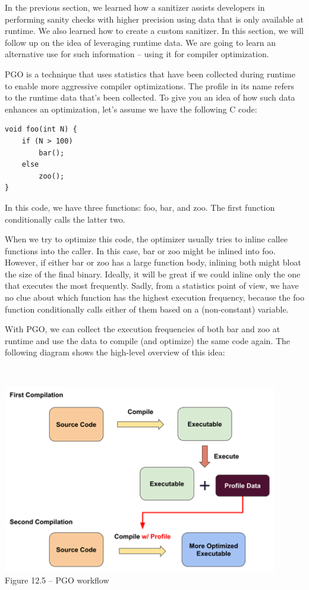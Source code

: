 
In the previous section, we learned how a sanitizer assists developers in performing sanity checks with higher precision using data that is only available at runtime. We also learned how to create a custom sanitizer. In this section, we will follow up on the idea of leveraging runtime data. We are going to learn an alternative use for such information – using it for compiler optimization.

PGO is a technique that uses statistics that have been collected during runtime to enable more aggressive compiler optimizations. The profile in its name refers to the runtime data that's been collected. To give you an idea of how such data enhances an optimization, let's assume we have the following C code:

\begin{lstlisting}[style=styleCXX]
void foo(int N) {
	if (N > 100)
		bar();
	else
		zoo();
}
\end{lstlisting}

In this code, we have three functions: foo, bar, and zoo. The first function conditionally calls the latter two.

When we try to optimize this code, the optimizer usually tries to inline callee functions into the caller. In this case, bar or zoo might be inlined into foo. However, if either bar or zoo has a large function body, inlining both might bloat the size of the final binary. Ideally, it will be great if we could inline only the one that executes the most frequently. Sadly, from a statistics point of view, we have no clue about which function has the highest execution frequency, because the foo function conditionally calls either of them based on a (non-constant) variable.

With PGO, we can collect the execution frequencies of both bar and zoo at runtime and use the data to compile (and optimize) the same code again. The following diagram shows the high-level overview of this idea:

\hspace*{\fill} \\ %
\begin{center}
\includegraphics[width=0.9\textwidth]{content/3/chapter12/images/5.png}\\
Figure 12.5 – PGO workflow
\end{center}

